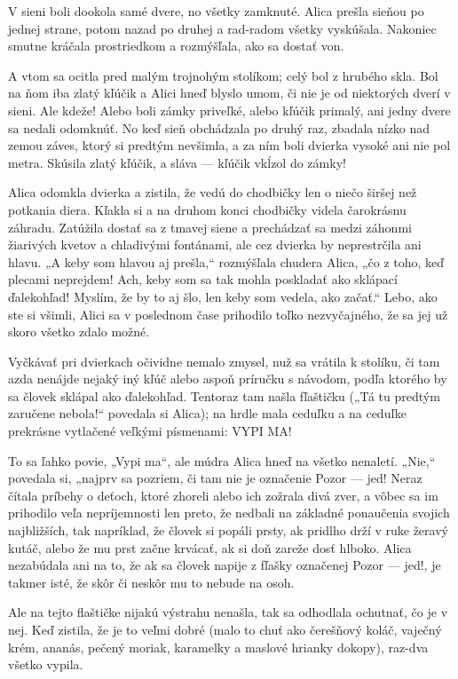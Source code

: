 \documentclass[12pt]{article}
\begin{document}
\begin{Parallel}[p]{}{}
{V sieni boli dookola samé dvere, no všetky zamknuté. Alica prešla sieňou po jednej strane, potom nazad po druhej a rad-radom všetky vyskúšala. Nakoniec smutne kráčala prostriedkom a rozmýšľala, ako sa dostať von.

A vtom sa ocitla pred malým trojnohým stolíkom; celý bol z hrubého skla. Bol na ňom iba zlatý kľúčik a Alici hneď blyslo umom, či nie je od niektorých dverí v sieni. Ale kdeže! Alebo boli zámky priveľké, alebo kľúčik primalý, ani
jedny dvere sa nedali odomknúť. No keď sieň obchádzala po druhý raz, zbadala nízko nad zemou záves, ktorý si predtým nevšimla, a za ním boli dvierka vysoké ani nie pol metra. Skúsila zlatý kľúčik, a sláva — kľúčik vkĺzol do zámky!

Alica odomkla dvierka a zistila, že vedú do chodbičky len o niečo širšej než potkania diera. Kľakla si a na druhom konci chodbičky videla čarokrásnu záhradu. Zatúžila dostať sa z tmavej siene a prechádzať sa medzi záhonmi žiarivých kvetov a chladivými fontánami, ale cez dvierka by neprestrčila ani hlavu. „A keby som hlavou aj prešla,“ rozmýšľala chudera Alica, „čo z toho, keď plecami neprejdem! Ach, keby som sa tak mohla poskladať ako sklápací ďalekohľad! Myslím, že by to aj šlo, len keby som vedela, ako začať.“ Lebo, ako ste si všimli, Alici sa v poslednom čase prihodilo toľko nezvyčajného, že sa jej už skoro všetko zdalo možné.

Vyčkávať pri dvierkach očividne nemalo zmysel, nuž sa vrátila k stolíku, či tam azda nenájde nejaký iný kľúč alebo aspoň príručku s návodom, podľa ktorého by sa človek sklápal ako ďalekohľad. Tentoraz tam našla fľaštičku („Tá tu predtým zaručene nebola!“ povedala si Alica); na hrdle mala ceduľku a na ceduľke prekrásne vytlačené veľkými písmenami: VYPI MA!

To sa ľahko povie, „Vypi ma“, ale múdra Alica hneď na všetko nenaletí. „Nie,“ povedala si, „najprv sa pozriem, či tam nie je označenie Pozor — jed! Neraz čítala príbehy o deťoch, ktoré zhoreli alebo ich zožrala divá zver, a vôbec sa im prihodilo veľa nepríjemnosti len preto, že nedbali na základné ponaučenia svojich najbližších, tak napríklad, že človek si popáli prsty, ak pridlho drží v ruke žeravý kutáč, alebo že mu prst začne krvácať, ak si doň zareže dosť hlboko. Alica nezabúdala ani na to, že ak sa človek napije z fľašky označenej Pozor — jed!, je takmer isté, že skôr či neskôr mu to nebude na osoh.

Ale na tejto flaštičke nijakú výstrahu nenašla, tak sa odhodlala ochutnať, čo je v nej. Keď zistila, že je to veľmi dobré (malo to chuť ako čerešňový koláč, vaječný krém, ananás, pečený moriak, karamelky a maslové hrianky dokopy), raz-dva všetko vypila.

}
\end{Parallel}
\end{document}
